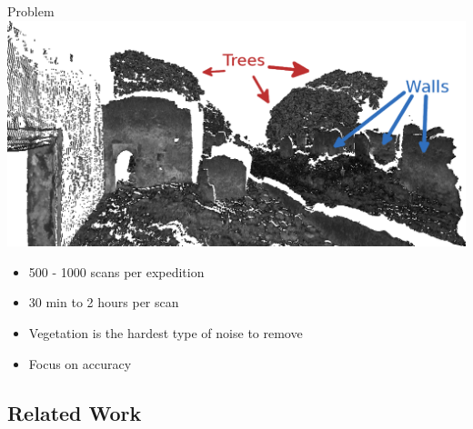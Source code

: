 \documentclass[compress]{beamer}
\begin{document}
\begin{frame}{Problem}
  \includegraphics[width=1\textwidth]{pics/dirty2}
  \begin{itemize}
  \item
  500 - 1000 scans per expedition
  \item
  30 min to 2 hours per scan
  \item
  Vegetation is the hardest type of noise to remove
  \item
  Focus on accuracy
  \end{itemize}
\end{frame}

\subsection{Related Work}
\end{document}
